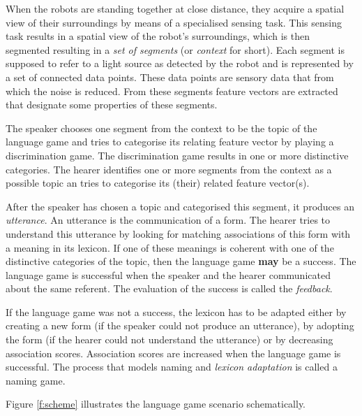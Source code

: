 When the robots are standing together at close distance, they acquire a spatial view of their surroundings by means of a specialised sensing task. This sensing task results in a spatial view of the robot's surroundings, which is then segmented resulting in a {\em set of segments} (or {\em context} for short). Each segment is supposed to refer to a light source as detected by the robot and is represented by a set of connected data points. These data points are sensory data that from which the noise is reduced. From these segments feature vectors are extracted that designate some properties of these segments. 

The speaker chooses one segment from the context to be the topic of the language game and tries to categorise its relating feature vector by playing a discrimination game. The discrimination game results in one or more distinctive categories. The hearer identifies one or more segments from the context as a possible topic an tries to categorise its (their) related feature vector(s).

After the speaker has chosen a topic and categorised this segment, it produces an {\em utterance}. An utterance is the communication of a form. The hearer tries to understand this utterance  by looking for matching associations of this form with a meaning in its lexicon. If one of these meanings is coherent with one of the distinctive categories of the topic, then the language game {\bf may} be a success. The language game is successful when the speaker and the hearer communicated about the same referent. The evaluation of the success is called the {\em feedback}.

If the language game was not a success, the lexicon has to be adapted either by creating a new form (if the speaker could not produce an utterance), by adopting the form (if the hearer could not understand the utterance) or by decreasing association scores. Association scores are increased when the language game is successful. The process that models naming and {\em lexicon adaptation} is called a {\sc naming game}.

Figure \ref{f:scheme} illustrates the language game scenario schematically.

